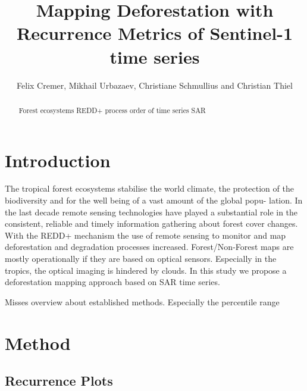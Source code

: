 \documentclass{article}
\title{Mapping Deforestation with Recurrence Metrics of Sentinel-1 time series}
\author{Felix Cremer, Mikhail Urbazaev, Christiane Schmullius and Christian Thiel}
\begin{document}
\maketitle
\begin{abstract}
  Forest ecosystems
  REDD+ process
  order of time series
  SAR

%
\end{abstract}
\section{Introduction}
The tropical forest ecosystems stabilise the world climate\cite{}, the protection of the biodiversity \cite{} and
for the well being of a vast amount of the global popu-
lation\cite{}.
 In the last decade remote sensing technologies have
played a substantial role in the consistent, reliable and timely
information gathering about forest cover changes. With the
REDD+ mechanism the use of remote sensing to monitor
and map deforestation and degradation processes increased.
Forest/Non-Forest maps are mostly operationally if
they are based on optical sensors. Especially in the tropics,
the optical imaging is hindered by clouds. In this study we
 propose a deforestation mapping approach based on SAR time
series.

Misses overview about established methods.
Especially the percentile range

\section{Method}

\subsection{Recurrence Plots}
\end{document}
